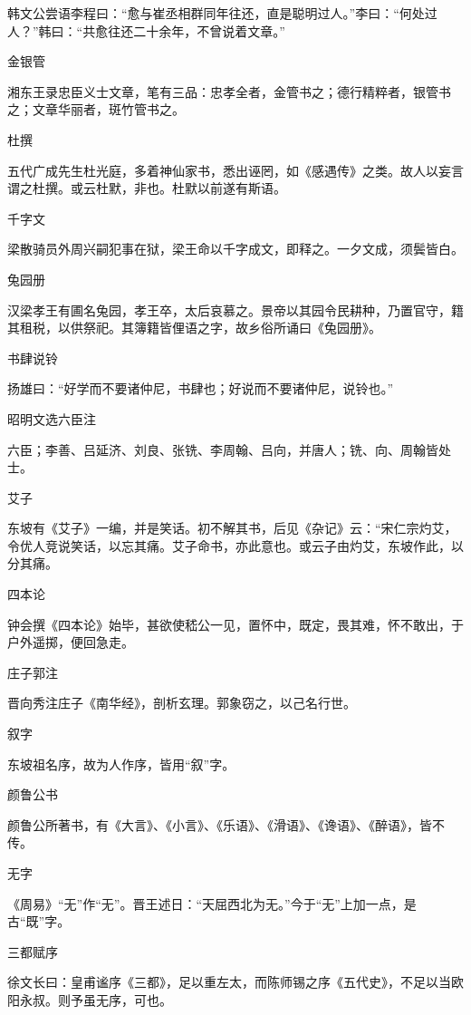 \documentclass[a4paper,12pt,UTF8,twoside]{ctexbook}
\begin{document}
    韩文公尝语李程曰：“愈与崔丞相群同年往还，直是聪明过人。”李曰：“何处过人？”韩曰：“共愈往还二十余年，不曾说着文章。”
    
    金银管
    
    湘东王录忠臣义士文章，笔有三品：忠孝全者，金管书之；德行精粹者，银管书之；文章华丽者，斑竹管书之。
    
    杜撰
    
    五代广成先生杜光庭，多着神仙家书，悉出诬罔，如《感遇传》之类。故人以妄言谓之杜撰。或云杜默，非也。杜默以前遂有斯语。
    
    千字文
    
    梁散骑员外周兴嗣犯事在狱，梁王命以千字成文，即释之。一夕文成，须鬓皆白。
    
    兔园册
    
    汉梁孝王有圃名兔园，孝王卒，太后哀慕之。景帝以其园令民耕种，乃置官守，籍其租税，以供祭祀。其簿籍皆俚语之字，故乡俗所诵曰《兔园册》。
    
    书肆说铃
    
    扬雄曰：“好学而不要诸仲尼，书肆也；好说而不要诸仲尼，说铃也。”
    
    昭明文选六臣注
    
    六臣；李善、吕延济、刘良、张铣、李周翰、吕向，并唐人；铣、向、周翰皆处士。
    
    艾子
    
    东坡有《艾子》一编，并是笑话。初不解其书，后见《杂记》云：“宋仁宗灼艾，令优人竞说笑话，以忘其痛。艾子命书，亦此意也。或云子由灼艾，东坡作此，以分其痛。
    
    四本论
    
    钟会撰《四本论》始毕，甚欲使嵇公一见，置怀中，既定，畏其难，怀不敢出，于户外遥掷，便回急走。
    
    庄子郭注
    
    晋向秀注庄子《南华经》，剖析玄理。郭象窃之，以己名行世。
    
    叙字
    
    东坡祖名序，故为人作序，皆用“叙”字。
    
    颜鲁公书
    
    颜鲁公所著书，有《大言》、《小言》、《乐语》、《滑语》、《谗语》、《醉语》，皆不传。
    
    无字
    
    《周易》“无”作“无”。晋王述日：“天屈西北为无。”今于“无”上加一点，是古“既”字。
    
    三都赋序
    
    徐文长曰：皇甫谧序《三都》，足以重左太，而陈师锡之序《五代史》，不足以当欧阳永叔。则予虽无序，可也。
    
\end{document}
